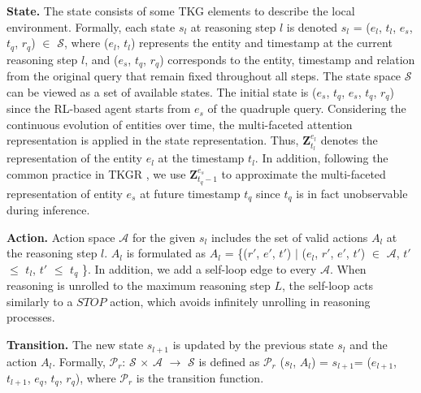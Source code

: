 \documentclass[sigconf,natbib=true]{acmart}
\begin{document}
\textbf{State.}  The state consists of some TKG elements to describe the local environment. Formally, each state $s_l$ at reasoning step $l$ is denoted $s_l$ = ($e_l$, $t_l$, $e_s$, $t_q$, $r_q$) $\in$ $\mathcal{S}$, where ($e_l$, $t_l$) represents the entity and timestamp at the current reasoning step $l$, and ($e_s$, $t_q$, $r_q$) corresponds to the entity, timestamp and relation from the original query that remain fixed throughout all steps. The state space $\mathcal{S}$ can be viewed as a set of available states. The initial state is ($e_s$, $t_q$, $e_s$, $t_q$, $r_q$) since the RL-based agent starts
from  $e_s$ of the quadruple query. Considering the continuous evolution of entities over time, the multi-faceted attention representation is applied in the state representation. Thus, $\textbf{Z}_{t_{l}}^{e_l}$ denotes the representation of the entity $e_l$ at the timestamp $t_l$. In addition, following the common practice in TKGR \cite{RE-NET, TKG-survey-bai}, we use $\textbf{Z}_{t_q-1}^{e_s}$ 
 to approximate the multi-faceted representation of entity $e_s$ at future timestamp $t_q$ since $t_q$ is in fact unobservable during inference.



\textbf{Action.} Action space $\mathcal{A}$ for the given $s_l$ includes the set of valid actions $A_l$ at the reasoning step $l$.  $A_l$  is formulated as $A_l$  = \{($r'$, $e'$, $t'$) $\mid$ ($e_l$, $r'$, $e'$, $t'$) $\in$ $\mathcal{A}$,  $t'$  $\leq$ $t_l$, $t'$ $\leq$ $t_q$  \}. In addition, we add a self-loop edge to every $\mathcal{A}$. When reasoning is unrolled to  the maximum reasoning step $L$, the self-loop acts similarly to a $STOP$ action, which avoids infinitely unrolling in reasoning processes.



\textbf{Transition.} The new state $s_{l+1}$ is updated by the previous state $s_l$ and the action $A_l$. Formally, $\mathcal{P}_r$: $\mathcal{S}$ $\times$ $\mathcal{A}$ $\rightarrow$ $\mathcal{S}$ is defined as $\mathcal{P}_r$ (\emph{$s_l$}, \emph{$A_l$}) = $s_{l+1}$= ($e_{l+1}$, $t_{l+1}$, $e_q$, $t_q$, $r_q$), where $\mathcal{P}_r$ is the transition function. %
\end{document}
